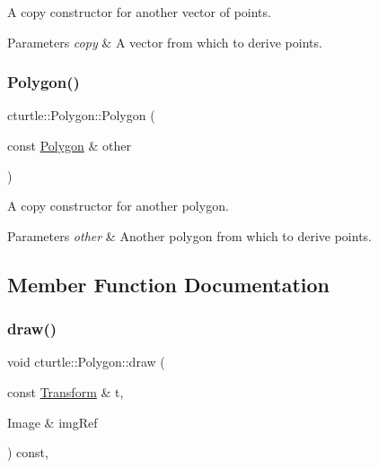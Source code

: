 A copy constructor for another vector of points. 


\begin{DoxyParams}{Parameters}
{\em copy} & A vector from which to derive points. \\
\hline
\end{DoxyParams}
\mbox{\label{classcturtle_1_1Polygon_a2f87d81daf3a02a53d2db818b74b6006}} 
\subsubsection{\texorpdfstring{Polygon()}{Polygon()}\hspace{0.1cm}{\footnotesize\ttfamily [3/3]}}
{\footnotesize\ttfamily cturtle\+::\+Polygon\+::\+Polygon (\begin{DoxyParamCaption}\item[{const \hyperlink{classcturtle_1_1Polygon}{Polygon} \&}]{other }\end{DoxyParamCaption})\hspace{0.3cm}{\ttfamily [inline]}}



A copy constructor for another polygon. 


\begin{DoxyParams}{Parameters}
{\em other} & Another polygon from which to derive points. \\
\hline
\end{DoxyParams}


\subsection{Member Function Documentation}
\mbox{\label{classcturtle_1_1Polygon_a4a0b6c44656957b141b74bd5c1542622}} 
\subsubsection{\texorpdfstring{draw()}{draw()}}
{\footnotesize\ttfamily void cturtle\+::\+Polygon\+::draw (\begin{DoxyParamCaption}\item[{const \hyperlink{classcturtle_1_1Transform}{Transform} \&}]{t,  }\item[{Image \&}]{img\+Ref }\end{DoxyParamCaption}) const\hspace{0.3cm}{\ttfamily [inline]}, {\ttfamily [virtual]}}



